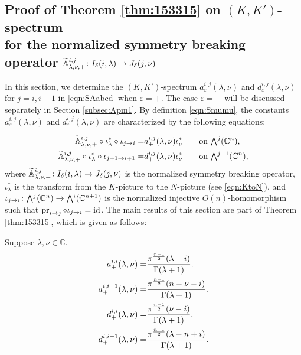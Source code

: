 \subsection{Proof of Theorem \ref{thm:153315}
 on $(K,K')$-spectrum
\\
 for the normalized symmetry breaking operator 
 ${\widetilde{\mathbb{A}}}_{{\lambda},{\nu},{+}}^{{i,j}}\colon
I_{\delta}(i,\lambda) \to J_{\delta}(j,\nu)$}
\label{subsec:Apm1-5}

In this section,
 we determine the $(K,K')$-spectrum $a_{\varepsilon}^{i,j}(\lambda,\nu)$
 and $d_{\varepsilon}^{i,j}(\lambda,\nu)$
 for $j=i, i-1$ 
 in \eqref{eqn:SAabcd}
 when $\varepsilon=+$.  
The case $\varepsilon=-$ will be discussed separately
 in Section \ref{subsec:Apm1}.  
By definition \eqref{eqn:Smumu}, 
 the constants $a_{\varepsilon}^{i,j}(\lambda,\nu)$
 and $d_{\varepsilon}^{i,j}(\lambda,\nu)$ are characterized 
 by the following equations:



\begin{alignat}{2}
\label{eqn:Aaij}
\Atbb \lambda \nu + {i,j}
\circ
\iota_{\lambda}^{\ast}
\circ
\iota_{j \to i}
=&
a_+^{i,j}(\lambda,\nu)
\iota_{\nu}^{\ast}
\quad
&&\text{on $\Exterior^{j}({\mathbb{C}}^{n})$,}
\\
\label{eqn:Adij}
\Atbb \lambda \nu + {i,j}
\circ
\iota_{\lambda}^{\ast}
\circ
\iota_{j+1 \to i+1}
=&
d_+^{i,j}(\lambda,\nu)
\iota_{\nu}^{\ast}
\quad
&&\text{on $\Exterior^{j+1}({\mathbb{C}}^{n})$}, 
\end{alignat}
where ${\widetilde{\mathbb{A}}}_{{\lambda},{\nu},{+}}^{{i,j}} \colon I_{\delta}(i,\lambda) \to J_{\delta}(j,\nu)$
 is the normalized symmetry breaking operator,
 $\iota_{\lambda}^{\ast}$ is the transform from the $K$-picture
 to the $N$-picture
 (see \eqref{eqn:KtoN}), 
 and 
$
\iota_{j \to i} \colon \Exterior^j({\mathbb{C}}^{n}) \to \Exterior^i({\mathbb{C}}^{n+1})
$ is the normalized injective $O(n)$-homomorphism
 such that
 $\operatorname{pr}_{{i}\to{j}} \circ \iota_{j \to i} = {\operatorname{id}}$.  
The main results of this section
 are part of Theorem \ref{thm:153315}, 
 which is given as follows:

\begin{theorem}
\label{thm:minKscalar}
Suppose $\lambda, \nu\in {\mathbb{C}}$.  
\begin{align}
a_+^{i,i}(\lambda,\nu)
=&
\frac{\pi^{\frac{n-1}{2}} (\lambda-i)}
     {\Gamma(\lambda+1)}.  
\notag
\\
a_+^{i,i-1}(\lambda,\nu)
=&
\frac{\pi^{\frac{n-1}{2}} (n-\nu-i)}
     {\Gamma(\lambda+1)}.  
\notag
\\
\label{eqn:pmIi-5}
   d_+^{i,i}(\lambda,\nu)
   =&
   \frac
   {\pi^{\frac {n-1}{2}} (\nu-i)}
   {\Gamma(\lambda+1)}.  
\\
\label{eqn:152361}
d_+^{i,i-1}(\lambda,\nu)=&\frac{\pi^{\frac{n-1}{2}} (\lambda-n+i)}{\Gamma(\lambda+1)}.  
\end{align}
\end{theorem}


